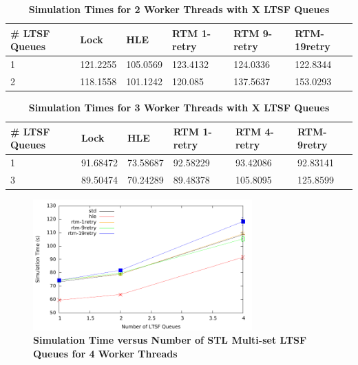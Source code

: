 \documentclass[11pt]{book}
\begin{document}
\begin{table}[H]
    \centering
    \begin{tabular}{l|p{2cm}|p{2cm}|p{2cm}|p{2cm}|p{2cm}}
        \textbf{\# LTSF Queues}&Lock &HLE &RTM 1-retry &RTM 9-retry &RTM-19retry \\
        \hline
        \midrule
            1 &121.2255  &105.0569 &123.4132  &124.0336 &122.8344 \\ 
            2 &118.1558  &101.1242 &120.085   &137.5637 &153.0293 \\
    \end{tabular}
    \caption{\textbf{Simulation Times for 2 Worker Threads with X LTSF Queues}}
    \label{tab:noThrMig_2threadsXschq}
\end{table}

\begin{table}[H]
    \centering
    \begin{tabular}{l|p{2cm}|p{2cm}|p{2cm}|p{2cm}|p{2cm}}
        \textbf{\# LTSF Queues}&Lock &HLE &RTM 1-retry &RTM 4-retry &RTM-9retry \\
        \hline
        \midrule
            1 &91.68472 &73.58687 &92.58229  &93.42086 &92.83141 \\ 
            3 &89.50474 &70.24289 &89.48378  &105.8095 &125.8599 \\
    \end{tabular}
    \caption{\textbf{Simulation Times for 3 Worker Threads with X LTSF Queues}}
    \label{tab:noThrMig_3threadsXschq}
\end{table}

\begin{figure}[H]
    \centering
    \graphicspath{ {./figures/} }
    \includegraphics[width=0.75\textwidth,keepaspectratio]{noThrMig-hugeEpidemicSim-timeVSschedQs-multiset-4thread}
    \caption{\textbf{Simulation Time versus Number of STL Multi-set LTSF Queues
    for 4 Worker Threads}}
    \label{fig:noThrMig_timeVSschq_4threads}
\end{figure}
\end{document}
